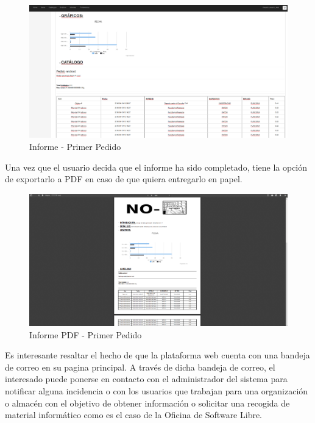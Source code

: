 \documentclass[a4paper,11pt]{book}
\begin{document}
\begin{figure}[H] 
\centering 
\includegraphics[scale=0.2]{imagenes/pruebas/informe_2.png}
\caption{ Informe - Primer Pedido\cite{propio}}
\end{figure}

Una vez que el usuario decida que el informe ha sido completado, tiene la opción de exportarlo a PDF en caso de que quiera entregarlo en papel.
\begin{figure}[H] 
\centering 
\includegraphics[scale=0.2]{imagenes/pruebas/informe_pdf.png}
\caption{ Informe PDF - Primer Pedido\cite{propio}}
\end{figure}

Es interesante resaltar el hecho de que la plataforma web cuenta con una bandeja de correo en su pagina principal. A través de dicha bandeja de correo, el interesado puede ponerse en contacto con el administrador del sistema para notificar alguna incidencia o con los usuarios que trabajan para una organización o  almacén con el objetivo de obtener información o solicitar una recogida de material informático como es el caso de la Oficina de Software Libre.  
 
\end{document}
